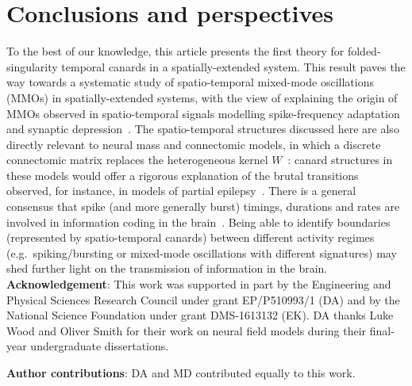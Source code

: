 \documentclass[aps,prl,reprint,superscriptaddress]{revtex4-1}
\newcommand{\edits}[1]{#1}
\begin{document}
\section{Conclusions and perspectives}
%
To the best of our knowledge, this article presents the first
theory for folded-singularity temporal canards in a spatially-extended system. This
result paves the way towards a systematic study of spatio-temporal mixed-mode
oscillations (MMOs) in spatially-extended systems, 
\edits{with the view of explaining the origin of MMOs observed in spatio-temporal
signals modelling spike-frequency adaptation and synaptic
depression~\cite{Folias2005aaa}.}
\edits{The spatio-temporal structures discussed here are also directly relevant to neural mass and
connectomic models, in which a discrete connectomic matrix replaces the heterogeneous
kernel $W$~\cite{Haimovici2013}: canard structures in
these models would offer a rigorous explanation of the brutal transitions observed,
for instance, in models of partial epilepsy~\cite{proix2014}}. There is a general
consensus that spike (and more generally burst) timings, durations and rates are
involved in information coding in the brain~\cite{borst1999}.  Being able to identify
boundaries (represented by spatio-temporal canards) between different activity
regimes (e.g.\ spiking/bursting or mixed-mode oscillations with different signatures)
may shed further light on the transmission of information in
the brain.
\newline
\textbf{Acknowledgement}: 
This work was supported in part by the Engineering and Physical Sciences Research
Council under grant EP/P510993/1 (DA) and by the National Science
Foundation under grant DMS-1613132 (EK). DA thanks Luke Wood and Oliver Smith
\edits{for their work on neural field models during their final-year undergraduate
dissertations.}

\noindent\textbf{Author contributions}: DA and MD contributed equally to this work.





 

\end{document}
